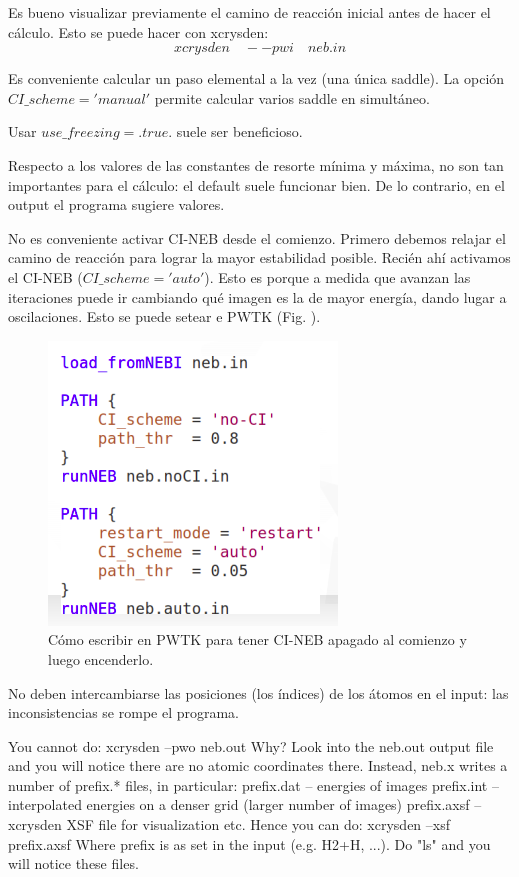   Es bueno visualizar previamente el camino de reacción inicial antes de hacer el cálculo. Esto se puede hacer con xcrysden:
    $$xcrysden \quad --pwi \quad neb.in$$

  Es conveniente calcular un paso elemental a la vez (una única saddle). La opción $CI\_scheme = 'manual'$ permite calcular varios saddle en simultáneo.

  Usar $use\_freezing = .true.$ suele ser beneficioso.

  Respecto a los valores de las constantes de resorte mínima y máxima, no son tan importantes para el cálculo: el default suele funcionar bien. De lo contrario, en el output el programa sugiere valores.

  No es conveniente activar CI-NEB desde el comienzo. Primero debemos relajar el camino de reacción para lograr la mayor estabilidad posible. Recién ahí activamos el CI-NEB ($CI\_scheme = 'auto'$). Esto es porque a medida que avanzan las iteraciones puede ir cambiando qué imagen es la de mayor energía, dando lugar a oscilaciones. Esto se puede setear e PWTK (Fig. ).

  \begin{figure}[H]
      \centering
      \includegraphics[scale = 0.8]{figs/D3/PWTK.png}
      \caption{Cómo escribir en PWTK para tener CI-NEB apagado al comienzo y luego encenderlo.}
      \label{fig:PWTK}
  \end{figure}

  No deben intercambiarse las posiciones (los índices) de los átomos en el input: las inconsistencias se rompe el programa.

  You cannot do:
  xcrysden --pwo neb.out
  Why? Look into the neb.out output file and you will notice there are no atomic coordinates there.
  Instead, neb.x writes a number of prefix.* files, in particular:
  prefix.dat -- energies of images
  prefix.int -- interpolated energies on a denser grid (larger number of images)
  prefix.axsf -- xcrysden XSF file for visualization
  etc.
  Hence you can do: xcrysden --xsf prefix.axsf
  Where prefix is as set in the input (e.g. H2+H, ...). Do "ls" and you will notice these files.

